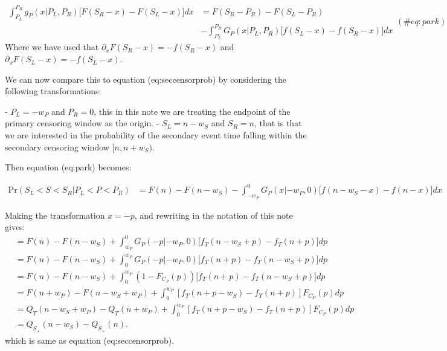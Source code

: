 \documentclass[10pt,letterpaper]{article}
\begin{document}
\begin{equation}
\begin{split}
\int_{P_L}^{P_R} g_P(x|P_L, P_R) \big[F(S_R - x) - F(S_L - x)\big] dx &=
F(S_R - P_R) - F(S_L - P_R)  \\ & - \int_{P_L}^{P_R} G_P(x|P_L, P_R) \big[f(S_L - x) - f(S_R - x)\big] dx
\end{split} (\#eq:park)
\end{equation}
Where we have used that $\partial_x F(S_R - x) = - f(S_R - x)$ and $\partial_x F(S_L - x) = - f(S_L - x)$.

We can now compare this to equation \@ref(eq:seccensorprob) by considering the following transformations:

- $P_L = -w_P$ and $P_R = 0$, this in this note we are treating the endpoint of the primary censoring window as the origin.
-  $S_L = n-w_S$ and $S_R = n$, that is that we are interested in the probability of the secondary event time falling within the secondary censoring window $[n, n+ w_S)$.

Then equation \@ref(eq:park) becomes:

\begin{equation}
\begin{aligned}
\mathrm{Pr}(S_L < S < S_R | P_L < P < P_R) &= F(n) - F(n-w_S) - \int_{-w_P}^{0} G_P(x|-w_P, 0) \big[f(n - w_S - x) - f(n - x)\big] dx
\end{aligned}
\end{equation}



Making the transformation $x = -p$, and rewriting in the notation of this note gives:
\begin{equation}
\begin{aligned}
&= F(n) - F(n-w_S) + \int_{w_P}^{0} G_P(-p|-w_P, 0) \big[f_T(n - w_S + p) - f_T(n +p)\big] dp \\
&= F(n) - F(n-w_S) + \int_{0}^{w_P} G_P(-p|-w_P, 0) \big[f_T(n + p) - f_T(n - w_S +p)\big] dp\\
&= F(n) - F(n-w_S) + \int_{0}^{w_P} (1 - F_{C_P}(p)) \big[f_T(n + p) - f_T(n - w_S +p)\big] dp\\
&= F(n + w_P) - F(n-w_S + w_P) + \int_{0}^{w_P} [f_T(n + p - w_S) - f_T(n + p)] F_{C_P}(p) dp\\
&= Q_T(n-w_S + w_P) - Q_T(n + w_P) + \int_{0}^{w_P} [f_T(n + p - w_S) - f_T(n + p)] F_{C_P}(p) dp \\
&= Q_{S_+}(n-w_S) - Q_{S_+}(n ).
\end{aligned}
\end{equation}
which is same as equation \@ref(eq:seccensorprob).
\end{document}
